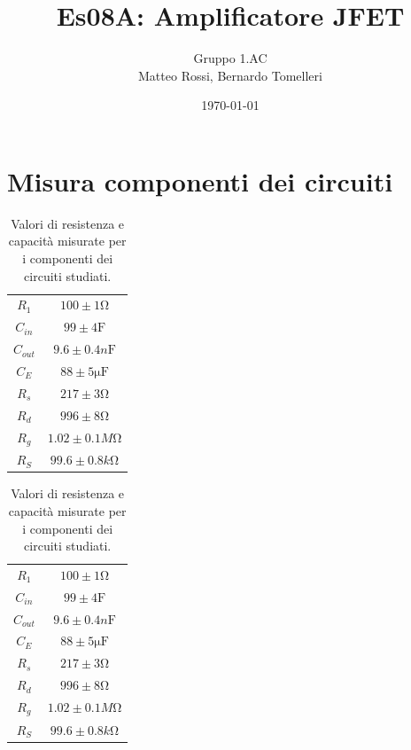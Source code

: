 \documentclass[10pt, a4paper, italian]{article}
\author{Gruppo 1.AC \\ Matteo Rossi, Bernardo Tomelleri}
\title{Es08A: Amplificatore JFET}
\begin{document}
\date{\today}
\maketitle

\setcounter{section}{0}

\section*{Misura componenti dei circuiti}
\begin{table}[htbp]
\centering
\begin{tabular}{cc}
\midrule
$R_1$	  	& $100 \pm 1 \si{\ohm}$\\
$C_{in}$	  	& $99 \pm 4 \si{\F}$	\\
$C_{out}$	& $9.6 \pm 0.4 \si{n\F}$	\\
$C_E$	  	& $88 \pm 5 \si{\micro \F}$\\
$R_s$	  	& $217 \pm 3 \si{\ohm}$	\\
$R_d$	  	& $996 \pm 8 \si{\ohm}$\\
$R_g$	  	& $1.02 \pm 0.1 \si{M\ohm}$\\
$R_S$	  	& $99.6 \pm 0.8 \si{k\ohm}$\\

\bottomrule     
\end{tabular}
\caption{Valori di resistenza e capacità misurate per i componenti dei
circuiti studiati. \label{tab: rcmes_B}}
\end{table}

\begin{table}[H]
\centering
\begin{tabular}{cc}
\midrule
$R_1$	  	& $100 \pm 1 \si{\ohm}$\\
$C_{in}$	  	& $99 \pm 4 \si{\F}$	\\
$C_{out}$	& $9.6 \pm 0.4 \si{n\F}$	\\
$C_E$	  	& $88 \pm 5 \si{\micro \F}$\\
$R_s$	  	& $217 \pm 3 \si{\ohm}$	\\
$R_d$	  	& $996 \pm 8 \si{\ohm}$\\
$R_g$	  	& $1.02 \pm 0.1 \si{M\ohm}$\\
$R_S$	  	& $99.6 \pm 0.8 \si{k\ohm}$\\

\bottomrule     
\end{tabular}
\caption{Valori di resistenza e capacità misurate per i componenti dei
circuiti studiati. \label{tab: rcmes_B}}
\end{table}
\end{document}
